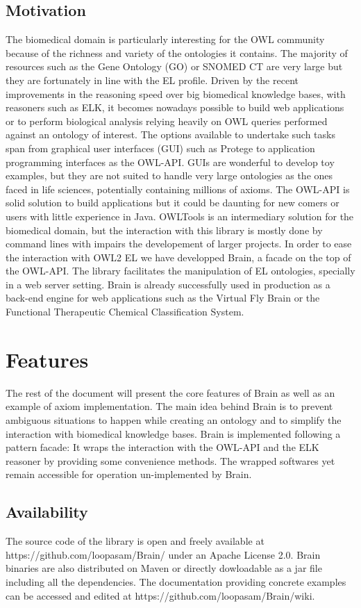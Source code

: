 \documentclass{llncs}
\begin{document}
\subsection{Motivation}
The biomedical domain is particularly interesting for the OWL community because of the richness and variety of the ontologies it contains.
The majority of resources such as the Gene Ontology (GO) or SNOMED CT are very large but they are fortunately in line with 
the EL profile.
Driven by the recent improvements in the reasoning speed over big biomedical knowledge bases, with reasoners such as ELK,
it becomes nowadays possible to build web applications or to perform biological analysis relying heavily on OWL queries performed against
an ontology of interest. 
The options available to undertake such tasks span from graphical user interfaces (GUI) such as Protege to application programming interfaces as
the OWL-API. GUIs are wonderful to develop toy examples, but they are not suited to handle very large 
ontologies as the ones faced in life sciences, potentially containing millions of axioms. The OWL-API is solid solution to build
applications but it could be daunting for new comers or users with little experience in Java. OWLTools is an intermediary solution for the
biomedical domain, but the interaction with this library is mostly done by command lines with impairs the developement of larger projects.
In order to ease the interaction with OWL2 EL we have developped Brain, a facade on the top of the OWL-API. The library facilitates the
manipulation of EL ontologies, specially in a web server setting. 
Brain is already successfully used in production as a back-end engine for web applications 
such as the Virtual Fly Brain or the Functional Therapeutic Chemical Classification System.

\section{Features}
The rest of the document will present the core features of Brain as well as an example of axiom implementation.
The main idea behind Brain is to prevent ambiguous situations to happen while creating an ontology and to simplify 
the interaction with biomedical knowledge bases. Brain is implemented following a pattern facade: 
It wraps the interaction with the OWL-API and the ELK reasoner by providing some convenience methods.
The wrapped softwares yet remain accessible for operation un-implemented by Brain.

\subsection{Availability}
The source code of the library is open and freely available at https://github.com/loopasam/Brain/ under an Apache License 2.0.
Brain binaries are also distributed on Maven or directly dowloadable as a jar file including all the dependencies.
The documentation providing concrete examples can be accessed and edited at https://github.com/loopasam/Brain/wiki.
\end{document}
